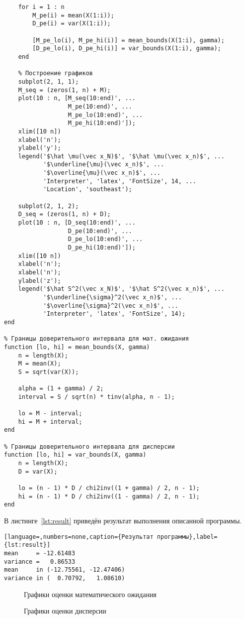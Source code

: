 \begin{lstlisting}[caption={Текст программы},label={lst:programm}]
    % Заполнение созданных массивов
    for i = 1 : n
        M_pe(i) = mean(X(1:i));
        D_pe(i) = var(X(1:i));

        [M_pe_lo(i), M_pe_hi(i)] = mean_bounds(X(1:i), gamma);
        [D_pe_lo(i), D_pe_hi(i)] = var_bounds(X(1:i), gamma);
    end

    % Построение графиков
    subplot(2, 1, 1);
    M_seq = (zeros(1, n) + M);
    plot(10 : n, [M_seq(10:end)', ...
                  M_pe(10:end)', ...
                  M_pe_lo(10:end)', ...
                  M_pe_hi(10:end)']);
    xlim([10 n])
    xlabel('n');
    ylabel('y');
    legend('$\hat \mu(\vec x_N)$', '$\hat \mu(\vec x_n)$', ...
           '$\underline{\mu}(\vec x_n)$', ...
           '$\overline{\mu}(\vec x_n)$', ...
           'Interpreter', 'latex', 'FontSize', 14, ...
           'Location', 'southeast');

    subplot(2, 1, 2);
    D_seq = (zeros(1, n) + D);
    plot(10 : n, [D_seq(10:end)', ...
                  D_pe(10:end)', ...
                  D_pe_lo(10:end)', ...
                  D_pe_hi(10:end)']);
    xlim([10 n])
    xlabel('n');
    xlabel('n');
    ylabel('z');
    legend('$\hat S^2(\vec x_N)$', '$\hat S^2(\vec x_n)$', ...
           '$\underline{\sigma}^2(\vec x_n)$', ...
           '$\overline{\sigma}^2(\vec x_n)$', ...
           'Interpreter', 'latex', 'FontSize', 14);
end

% Границы доверительного интервала для мат. ожидания
function [lo, hi] = mean_bounds(X, gamma)
    n = length(X);
    M = mean(X);
    S = sqrt(var(X));

    alpha = (1 + gamma) / 2;
    interval = S / sqrt(n) * tinv(alpha, n - 1);

    lo = M - interval;
    hi = M + interval;
end

% Границы доверительного интервала для дисперсии
function [lo, hi] = var_bounds(X, gamma)
    n = length(X);
    D = var(X);

    lo = (n - 1) * D / chi2inv((1 + gamma) / 2, n - 1);
    hi = (n - 1) * D / chi2inv((1 - gamma) / 2, n - 1);
end
\end{lstlisting}

В листинге~\ref{lst:result} приведён результат выполнения описанной программы.
\begin{lstlisting}[language=,numbers=none,caption={Результат программы},label={lst:result}]
mean     = -12.61483
variance =   0.86533
mean     in (-12.75561, -12.47406)
variance in (  0.70792,   1.08610)
\end{lstlisting}

\begin{figure}[H]
    \caption{Графики оценки математического ожидания}\label{img:plot01}

    
\end{figure}

\begin{figure}[H]
    \caption{Графики оценки дисперсии}\label{img:plot02}
    
\end{figure}

